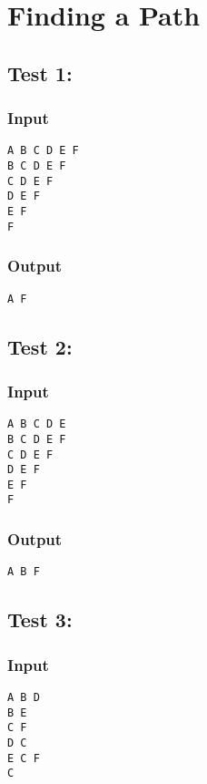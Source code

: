 \documentclass[twocolumn,9pt]{extarticle}
\begin{document}
\section{Finding a Path}
\subsection*{Test 1:}
\subsubsection*{Input}
\texttt{A B C D E F\\
B C D E F\\
C D E F\\
D E F\\
E F\\
F}

\subsubsection*{Output}
\texttt{A F}

\subsection*{Test 2:}
\subsubsection*{Input}
\texttt{A B C D E\\
B C D E F\\
C D E F\\
D E F\\
E F\\
F}

\subsubsection*{Output}
\texttt{A B F}

\subsection*{Test 3:}
\subsubsection*{Input}
\texttt{A B D\\
B E\\
C F\\
D C\\
E C F\\
C}
\end{document}
